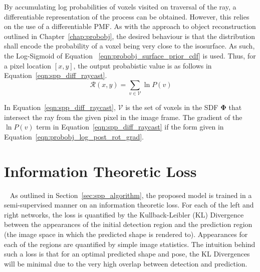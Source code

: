 By accumulating log probabilities of voxels visited on traversal of the ray, a differentiable representation 
of the process can be obtained. However, this relies on the use of a differentiable PMF\@. As with the approach 
to object reconstruction outlined in Chapter~\ref{chap:probobj}, the desired behaviour is that the distribution 
shall encode the probability of a voxel being very close to the isosurface. As such, the Log-Sigmoid of Equation
~\ref{eqn:probobj_surface_prior_cdf} is used. Thus, for a pixel location \( [x, y] \), the output probabistic 
value is as follows in Equation~\ref{eqn:spp_diff_raycast}.
\begin{equation}
~\label{eqn:spp_diff_raycast}
\mathcal{R}(x, y) = \sum_{v \in \mathcal{V}} \ln P(v)
\end{equation}

In Equation~\ref{eqn:spp_diff_raycast}, \( \mathcal{V} \) is the set of voxels in the SDF \( \bm{\Phi} \) that 
intersect the ray from the given pixel in the image frame. The gradient of the \( \ln P(v) \) term in 
Equation~\ref{eqn:spp_diff_raycast} if the form given in Equation~\ref{eqn:probobj_log_post_rot_grad}.

\section{Information Theoretic Loss}
~\label{sec:spp_loss}
As outlined in Section~\ref{sec:spp_algorithm}, the proposed model is trained in a semi-supervised 
manner on an information theoretic loss. For each of the left and right networks, the loss is 
quantified by the Kullback-Leibler (KL) Divergence between the appearances of the initial detection region 
and the prediction region (the image space in which the predicted shape is rendered to). Appearances for 
each of the regions are quantified by simple image statistics. The intuition behind such a loss is that 
for an optimal predicted shape and pose, the KL Divergences will be minimal due to the very high overlap 
between detection and prediction.

